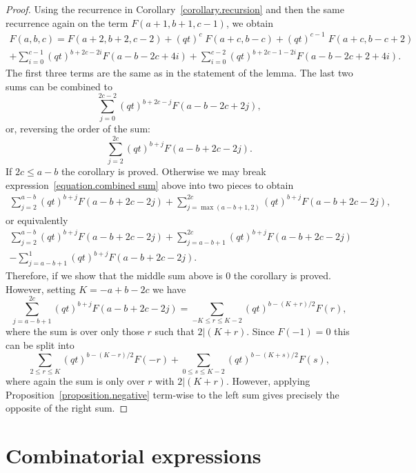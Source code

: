 \documentclass[11pt,reqno]{amsart}
\theoremstyle{definition}
\numberwithin{equation}{section}
\begin{document}
\begin{proof}
Using the recurrence in Corollary~\ref{corollary.recursion} and then the same recurrence 
again on the term $F(a+1,b+1,c-1)$, we obtain
\begin{multline*}
	F(a,b,c) = F(a+2,b+2,c-2) + (qt)^c \; F(a+c,b-c) + (qt)^{c-1} \; F(a+c,b-c+2)\\
	+ \sum_{i=0}^{c-1} (qt)^{b+2c-2i} F(a-b-2c+4i) + \sum_{i=0}^{c-2} (qt)^{b+2c-1-2i} F(a-b-2c+2+4i).
\end{multline*}
The first three terms are the same as in the statement of the lemma. The last two sums can be combined to
\begin{equation*}
	\sum_{j=0}^{2c-2} (qt)^{b+2c-j} F(a-b-2c+2j),
\end{equation*}
or, reversing the order of the sum: 
\begin{equation}
\label{equation.combined sum}
	\sum_{j=2}^{2c} (qt)^{b+j} F(a-b+2c-2j).
\end{equation}
If $2c \leqslant a-b$ the corollary is proved. Otherwise we may break expression~\eqref{equation.combined sum}
above into two pieces to obtain
\begin{eqnarray*}
	\sum_{j=2}^{a-b} (qt)^{b+j} F(a-b+2c-2j) + 	\sum_{j=\max(a-b+1,2)}^{2c} (qt)^{b+j} F(a-b+2c-2j),
	\end{eqnarray*}
or equivalently 
\begin{multline*}
		\sum_{j=2}^{a-b} (qt)^{b+j} F(a-b+2c-2j) +\sum_{j=a-b+1}^{2c} (qt)^{b+j}F(a-b+2c-2j) \\
		-\sum_{j=a-b+1}^{1} (qt)^{b+j}F(a-b+2c-2j).
\end{multline*}
Therefore, if we show that the middle sum above is $0$ the corollary is proved.  However, setting $K=-a+b-2c$ we have
\[
	\sum_{j=a-b+1}^{2c} (qt)^{b+j}F(a-b+2c-2j)
	=\sum_{-K  \leqslant r \leqslant K-2} (qt)^{b-(K+r)/2}F(r),
\]
where the sum is over only those $r$ such that $2| (K+r)$.  Since $F(-1)=0$ this can be split into
\[
	\sum_{2  \leqslant r \leqslant K} (qt)^{b-(K-r)/2}F(-r)
	+\sum_{0  \leqslant s \leqslant K-2} (qt)^{b-(K+s)/2}F(s),
\]
where again the sum is only over $r$ with $2| (K+r)$.  However, applying  Proposition~\ref{proposition.negative} 
term-wise to the left sum gives precisely the opposite of the right sum.
\end{proof}

\section{Combinatorial expressions}
\label{section.combinatorial expressions}
\end{document}
